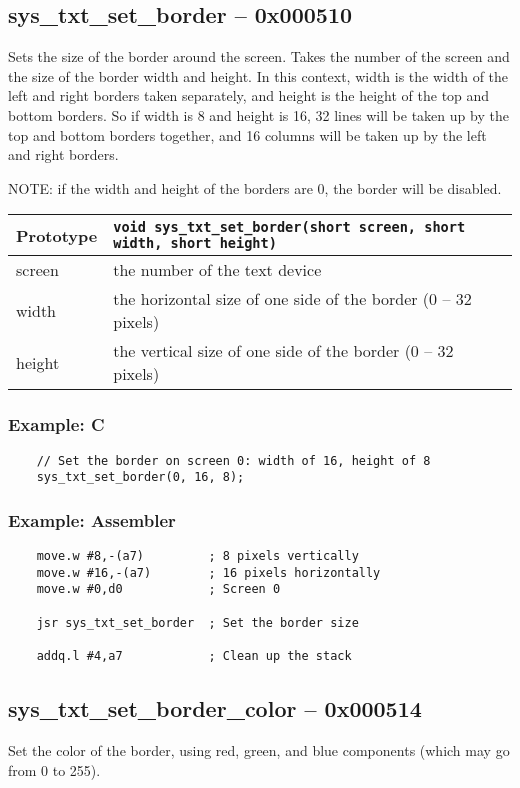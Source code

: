 \subsection*{sys\_txt\_set\_border -- 0x000510}
Sets the size of the border around the screen. Takes the number of the screen and the size of the border width and height.
In this context, width is the width of the left and right borders taken separately, and height is the height of the top and bottom borders.
So if width is 8 and height is 16, 32 lines will be taken up by the top and bottom borders together,
and 16 columns will be taken up by the left and right borders.

NOTE: if the width and height of the borders are 0, the border will be disabled.

\bigskip

\begin{tabular}{|l||l|} \hline
Prototype & \lstinline!void sys_txt_set_border(short screen, short width, short height)! \\ \hline
screen & the number of the text device \\ \hline
width & the horizontal size of one side of the border (0 -- 32 pixels) \\ \hline
height & the vertical size of one side of the border (0 -- 32 pixels) \\ \hline
\end{tabular}

\subsubsection*{Example: C}
\begin{lstlisting}
    // Set the border on screen 0: width of 16, height of 8
    sys_txt_set_border(0, 16, 8);
\end{lstlisting}

\subsubsection*{Example: Assembler}
\begin{verbatim}
    move.w #8,-(a7)         ; 8 pixels vertically
    move.w #16,-(a7)        ; 16 pixels horizontally
    move.w #0,d0            ; Screen 0

    jsr sys_txt_set_border  ; Set the border size

    addq.l #4,a7            ; Clean up the stack
\end{verbatim}


\subsection*{sys\_txt\_set\_border\_color -- 0x000514}
Set the color of the border, using red, green, and blue components (which may go from 0 to 255).

